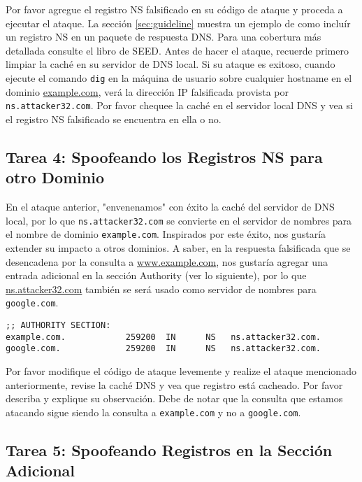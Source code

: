Por favor agregue el registro NS falsificado en su código de ataque y proceda a ejecutar el ataque. La sección \ref{sec:guideline} muestra un ejemplo de como incluír un registro NS en un paquete de respuesta DNS.
Para una cobertura más detallada consulte el libro de SEED.
Antes de hacer el ataque, recuerde primero limpiar la caché en su servidor de DNS local.
Si su ataque es exitoso, cuando ejecute el comando \texttt{dig} en la máquina de usuario sobre cualquier hostname en el dominio \url{example.com}, verá la dirección IP falsificada provista por \texttt{ns.attacker32.com}. Por favor chequee la caché en el servidor local DNS y vea si el registro NS falsificado se encuentra en ella o no.



\subsection{Tarea 4: Spoofeando los Registros NS para otro Dominio} 

En el ataque anterior, "envenenamos" con éxito la caché del servidor de DNS local, por lo que \texttt{ns.attacker32.com} se convierte en el servidor de nombres para el nombre de dominio \texttt{example.com}. Inspirados por este éxito, nos gustaría extender su impacto a otros dominios. A saber, en la respuesta falsificada 	que se desencadena por la consulta a \url{www.example.com}, nos gustaría agregar una entrada adicional en la sección Authority (ver lo siguiente), por lo que \url{ns.attacker32.com} también se será usado como servidor de nombres para \texttt{google.com}.


\begin{lstlisting}
;; AUTHORITY SECTION:
example.com.            259200  IN      NS   ns.attacker32.com.
google.com.             259200  IN      NS   ns.attacker32.com.
\end{lstlisting}

Por favor modifique el código de ataque levemente y realize el ataque mencionado anteriormente, revise la caché DNS y vea que registro está cacheado.
Por favor describa y explique su observación. Debe de notar que la consulta que estamos atacando sigue siendo la consulta a \texttt{example.com} y no a \texttt{google.com}.  


\subsection{Tarea 5: Spoofeando Registros en la Sección Adicional}

